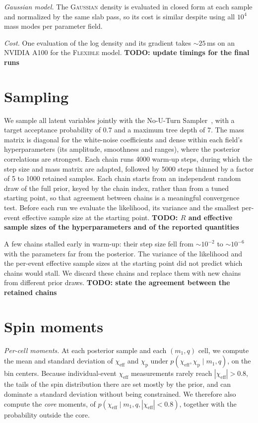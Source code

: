 \documentclass[%
 reprint,
 amsmath,amssymb,
 aps,
 prl,
 nofootinbib,nobibnotes,
 floatfix,
]{revtex4-2}
\newcommand{\chieff}{\ensuremath{\chi_{\mathrm{eff}}}}
\newcommand{\chip}{\ensuremath{\chi_{\mathrm{p}}}}
\newcommand{\todo}[1]{{\color{Blue}\bf TODO: #1}}
\newcommand{\flexiblespins}{\textsc{Flexible}\xspace}
\newcommand{\gaussianspins}{\textsc{Gaussian}\xspace}
\begin{document}
\textit{Gaussian model.} The \gaussianspins density is evaluated in closed form at each sample and normalized by the same slab pass, so its cost is similar despite using all $10^4$ mass modes per parameter field.

\textit{Cost.} One evaluation of the log density and its gradient takes $\sim 25$\,ms on an NVIDIA A100 for the \flexiblespins model. \todo{update timings for the final runs}

\section{Sampling}
\label{sm: sampling}

We sample all latent variables jointly with the No-U-Turn Sampler~\cite{Hoffman:2014nuts}, with a target acceptance probability of 0.7 and a maximum tree depth of 7. The mass matrix is diagonal for the white-noise coefficients and dense within each field's hyperparameters (its amplitude, smoothness and ranges), where the posterior correlations are strongest. Each chain runs 4000 warm-up steps, during which the step size and mass matrix are adapted, followed by 5000 steps thinned by a factor of 5 to 1000 retained samples. Each chain starts from an independent random draw of the full prior, keyed by the chain index, rather than from a tuned starting point, so that agreement between chains is a meaningful convergence test. Before each run we evaluate the likelihood, its variance and the smallest per-event effective sample size at the starting point. \todo{$\hat{R}$ and effective sample sizes of the hyperparameters and of the reported quantities}

A few chains stalled early in warm-up: their step size fell from $\sim 10^{-2}$ to $\sim 10^{-6}$ with the parameters far from the posterior. The variance of the likelihood and the per-event effective sample sizes at the starting point did not predict which chains would stall. We discard these chains and replace them with new chains from different prior draws. \todo{state the agreement between the retained chains}

\section{Spin moments}
\label{sm: moments}

\textit{Per-cell moments.} At each posterior sample and each $(m_1, q)$ cell, we compute the mean and standard deviation of $\chieff$ and $\chip$ under $p(\chieff, \chip \mid m_1, q)$, on the bin centers. Because individual-event $\chieff$ measurements rarely reach $|\chieff| > 0.8$, the tails of the spin distribution there are set mostly by the prior, and can dominate a standard deviation without being constrained. We therefore also compute the \emph{core} moments, of $p(\chieff \mid m_1, q, |\chieff| < 0.8)$, together with the probability outside the core.
\end{document}
